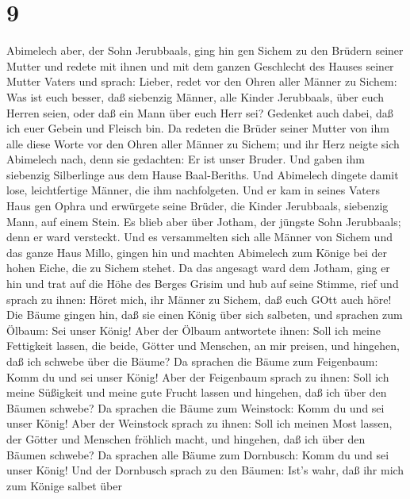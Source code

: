 \hypertarget{section-8}{%
\section{9}\label{section-8}}

 Abimelech aber, der Sohn Jerubbaals, ging hin gen Sichem zu
den Brüdern seiner Mutter und redete mit ihnen und mit dem ganzen
Geschlecht des Hauses seiner Mutter Vaters und sprach: 
Lieber, redet vor den Ohren aller Männer zu Sichem: Was ist euch besser,
daß siebenzig Männer, alle Kinder Jerubbaals, über euch Herren seien,
oder daß ein Mann über euch Herr sei? Gedenket auch dabei, daß ich euer
Gebein und Fleisch bin.  Da redeten die Brüder seiner Mutter
von ihm alle diese Worte vor den Ohren aller Männer zu Sichem; und ihr
Herz neigte sich Abimelech nach, denn sie gedachten: Er ist unser
Bruder.  Und gaben ihm siebenzig Silberlinge aus dem Hause
Baal-Beriths. Und Abimelech dingete damit lose, leichtfertige Männer,
die ihm nachfolgeten.  Und er kam in seines Vaters Haus gen
Ophra und erwürgete seine Brüder, die Kinder Jerubbaals, siebenzig Mann,
auf einem Stein. Es blieb aber über Jotham, der jüngste Sohn Jerubbaals;
denn er ward versteckt.  Und es versammelten sich alle
Männer von Sichem und das ganze Haus Millo, gingen hin und machten
Abimelech zum Könige bei der hohen Eiche, die zu Sichem stehet.
 Da das angesagt ward dem Jotham, ging er hin und trat auf
die Höhe des Berges Grisim und hub auf seine Stimme, rief und sprach zu
ihnen: Höret mich, ihr Männer zu Sichem, daß euch GOtt auch höre!
 Die Bäume gingen hin, daß sie einen König über sich
salbeten, und sprachen zum Ölbaum: Sei unser König!  Aber
der Ölbaum antwortete ihnen: Soll ich meine Fettigkeit lassen, die
beide, Götter und Menschen, an mir preisen, und hingehen, daß ich
schwebe über die Bäume?  Da sprachen die Bäume zum
Feigenbaum: Komm du und sei unser König!  Aber der
Feigenbaum sprach zu ihnen: Soll ich meine Süßigkeit und meine gute
Frucht lassen und hingehen, daß ich über den Bäumen schwebe?
 Da sprachen die Bäume zum Weinstock: Komm du und sei unser
König!  Aber der Weinstock sprach zu ihnen: Soll ich meinen
Most lassen, der Götter und Menschen fröhlich macht, und hingehen, daß
ich über den Bäumen schwebe?  Da sprachen alle Bäume zum
Dornbusch: Komm du und sei unser König!  Und der Dornbusch
sprach zu den Bäumen: Ist's wahr, daß ihr mich zum Könige salbet über

